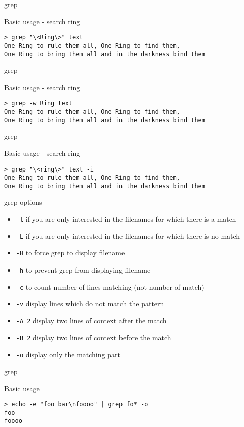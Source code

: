 \begin{frame}[fragile]{grep}
  \begin{exampleblock}{Basic usage - search ring}
    \begin{lstlisting}[showstringspaces=false,basicstyle=\tiny]
> grep "\<Ring\>" text
One Ring to rule them all, One Ring to find them,
One Ring to bring them all and in the darkness bind them
    \end{lstlisting}
  \end{exampleblock}
\end{frame}


\begin{frame}[fragile]{grep}
  \begin{exampleblock}{Basic usage - search ring}
    \begin{lstlisting}[showstringspaces=false,basicstyle=\tiny]
> grep -w Ring text
One Ring to rule them all, One Ring to find them,
One Ring to bring them all and in the darkness bind them
    \end{lstlisting}
  \end{exampleblock}
\end{frame}


\begin{frame}[fragile]{grep}
  \begin{exampleblock}{Basic usage - search ring}
    \begin{lstlisting}[showstringspaces=false,basicstyle=\tiny]
> grep "\<ring\>" text -i
One Ring to rule them all, One Ring to find them,
One Ring to bring them all and in the darkness bind them
    \end{lstlisting}
  \end{exampleblock}
\end{frame}


\begin{frame}[fragile]{grep options}
  \begin{itemize}
    \item \texttt{-l} if you are only interested in the filenames for which there is a match
    \pause \item \texttt{-L} if you are only interested in the filenames for which there is no match
    \pause \item \texttt{-H} to force grep to display filename
    \pause \item \texttt{-h} to prevent grep from displaying filename
    \pause \item \texttt{-c} to count number of lines matching (not number of match)
    \pause \item \texttt{-v} display lines which do not match the pattern
    \pause \item \texttt{-A 2} display two lines of context after the match
    \pause \item \texttt{-B 2} display two lines of context before the match
    \pause \item \texttt{-o} display only the matching part 
  \end{itemize}
\end{frame}


\begin{frame}[fragile]{grep}
  \begin{exampleblock}{Basic usage}
    \begin{lstlisting}[showstringspaces=false]
> echo -e "foo bar\nfoooo" | grep fo* -o
foo
foooo
    \end{lstlisting}
  \end{exampleblock}
\end{frame}

